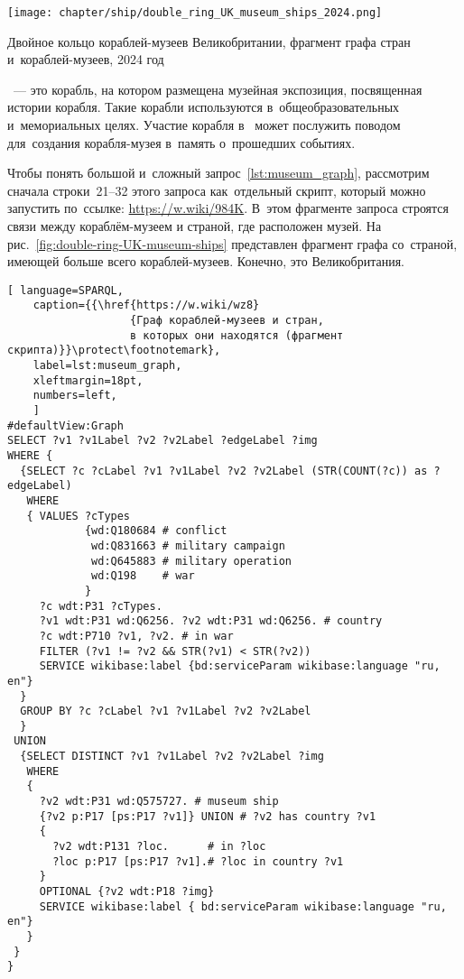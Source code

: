 \begin{marginfigure}[0\baselineskip]
  \texttt{[image: chapter/ship/double\_ring\_UK\_museum\_ships\_2024.png]}
  \caption{Двойное кольцо кораблей-музеев Великобритании, 
           фрагмент графа стран и~кораблей-музеев, 2024 год}
  \label{fig:double-ring-UK-museum-ships}%
\end{marginfigure}%

~--- это корабль, 
на котором размещена музейная экспозиция, посвященная истории корабля. 
Такие корабли используются в~общеобразовательных и~мемориальных целях. 
Участие корабля в~ может послужить поводом 
для~создания корабля-музея в~память о~прошедших событиях. 

Чтобы понять большой и~сложный запрос~\ref{lst:museum_graph}, 
рассмотрим сначала строки~21--32 этого запроса как~отдельный скрипт, 
который можно запустить по~ссылке: \href{https://w.wiki/984K}
                                        {https://w.wiki/984K}. 
В~этом фрагменте запроса строятся связи между кораблём-музеем и страной, где расположен музей. 
На рис.~\ref{fig:double-ring-UK-museum-ships} представлен фрагмент графа 
со~страной, имеющей больше всего кораблей-музеев. Конечно, это Великобритания. 



                                        


\newpage
\begin{lstlisting}[ language=SPARQL, 
    caption={{\href{https://w.wiki/wz8}
                   {Граф кораблей-музеев и стран, 
                   в которых они находятся (фрагмент скрипта)}}\protect\footnotemark}, 
    label=lst:museum_graph,
    xleftmargin=18pt, 
    numbers=left,
    ]
#defaultView:Graph    
SELECT ?v1 ?v1Label ?v2 ?v2Label ?edgeLabel ?img 
WHERE {
  {SELECT ?c ?cLabel ?v1 ?v1Label ?v2 ?v2Label (STR(COUNT(?c)) as ?edgeLabel) 
   WHERE
   { VALUES ?cTypes 
            {wd:Q180684 # conflict
             wd:Q831663 # military campaign
             wd:Q645883 # military operation
             wd:Q198    # war
            } 
     ?c wdt:P31 ?cTypes.
     ?v1 wdt:P31 wd:Q6256. ?v2 wdt:P31 wd:Q6256. # country
     ?c wdt:P710 ?v1, ?v2. # in war
     FILTER (?v1 != ?v2 && STR(?v1) < STR(?v2)) 
     SERVICE wikibase:label {bd:serviceParam wikibase:language "ru, en"}
  }
  GROUP BY ?c ?cLabel ?v1 ?v1Label ?v2 ?v2Label
  }
 UNION
  {SELECT DISTINCT ?v1 ?v1Label ?v2 ?v2Label ?img
   WHERE
   {
     ?v2 wdt:P31 wd:Q575727. # museum ship
     {?v2 p:P17 [ps:P17 ?v1]} UNION # ?v2 has country ?v1
     {
       ?v2 wdt:P131 ?loc.      # in ?loc
       ?loc p:P17 [ps:P17 ?v1].# ?loc in country ?v1
     } 
     OPTIONAL {?v2 wdt:P18 ?img}
     SERVICE wikibase:label { bd:serviceParam wikibase:language "ru, en"}
   }
 }
}
\end{lstlisting}


